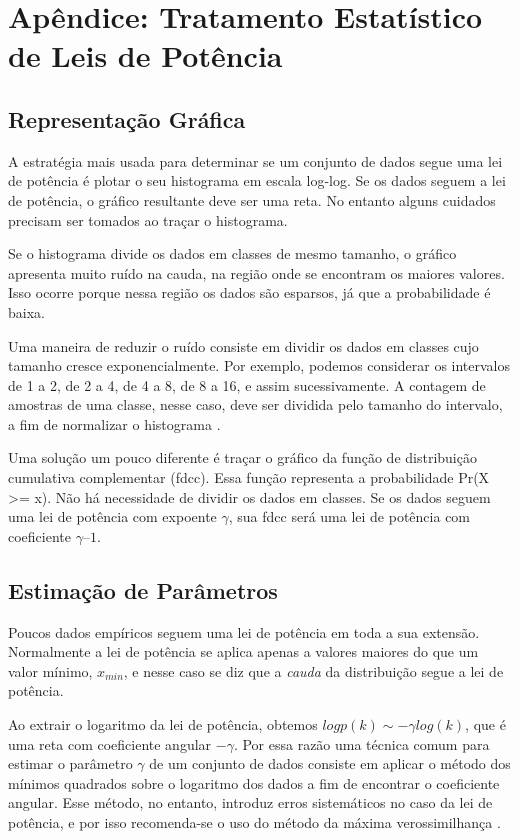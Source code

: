 ﻿\documentclass{article}
\begin{document}
\section{Apêndice: Tratamento Estatístico de Leis de Potência} \label{sec:estatistica}

\subsection{Representação Gráfica}

A estratégia mais usada para determinar se um conjunto de dados segue uma lei de potência é plotar o seu histograma em escala log-log. Se os dados seguem a lei de potência, o gráfico resultante deve ser uma reta. No entanto alguns cuidados precisam ser tomados ao traçar o histograma.

Se o histograma divide os dados em classes de mesmo tamanho, o gráfico apresenta muito ruído na cauda, na região onde se encontram os maiores valores. Isso ocorre porque nessa região os dados são esparsos, já que a probabilidade é baixa. 

Uma maneira de reduzir o ruído consiste em dividir os dados em classes cujo tamanho cresce exponencialmente. Por exemplo, podemos considerar os intervalos de 1 a 2, de 2 a 4, de 4 a 8, de 8 a 16, e assim sucessivamente. A contagem de amostras de uma classe, nesse caso, deve ser dividida pelo tamanho do intervalo, a fim de normalizar o histograma \cite{Newman2005}.

Uma solução um pouco diferente é traçar o gráfico da função de distribuição cumulativa complementar (fdcc). Essa função representa a probabilidade Pr(X >= x). Não há necessidade de dividir os dados em classes. Se os dados seguem uma lei de potência com expoente $\gamma$, sua fdcc será uma lei de potência com coeficiente $\gamma – 1$.


\subsection{Estimação de Parâmetros}

Poucos dados empíricos seguem uma lei de potência em toda a sua extensão. Normalmente a lei de potência se aplica apenas a valores maiores do que um valor mínimo, $x_{min}$, e nesse caso se diz que a \emph{cauda} da distribuição segue a lei de potência.

Ao extrair o logaritmo da lei de potência, obtemos $log p(k) \sim -\gamma log(k)$, que é uma reta com coeficiente angular $-\gamma$. Por essa razão uma técnica comum para estimar o parâmetro $\gamma$ de um conjunto de dados consiste em aplicar o método dos mínimos quadrados sobre o logaritmo dos dados a fim de encontrar o coeficiente angular. Esse método, no entanto, introduz erros sistemáticos no caso da lei de potência, e por isso recomenda-se o uso do método da máxima verossimilhança \cite{Clauset2007}.
\end{document}
